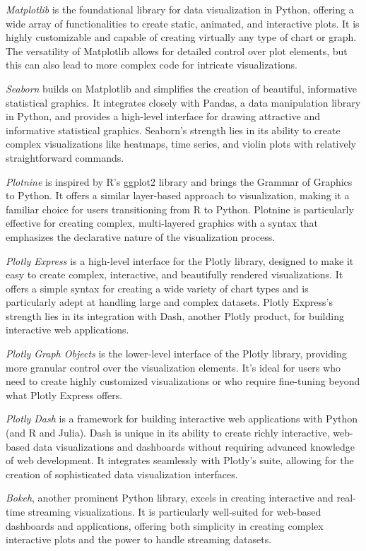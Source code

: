 \emph{Matplotlib} is the foundational library for data visualization in Python, offering a wide array of functionalities to create static, animated, and interactive plots. It is highly customizable and capable of creating virtually any type of chart or graph. The versatility of Matplotlib allows for detailed control over plot elements, but this can also lead to more complex code for intricate visualizations.

\emph{Seaborn} builds on Matplotlib and simplifies the creation of beautiful, informative statistical graphics. It integrates closely with Pandas, a data manipulation library in Python, and provides a high-level interface for drawing attractive and informative statistical graphics. Seaborn's strength lies in its ability to create complex visualizations like heatmaps, time series, and violin plots with relatively straightforward commands.

\emph{Plotnine} is inspired by R's ggplot2 library and brings the Grammar of Graphics to Python. It offers a similar layer-based approach to visualization, making it a familiar choice for users transitioning from R to Python. Plotnine is particularly effective for creating complex, multi-layered graphics with a syntax that emphasizes the declarative nature of the visualization process.

\emph{Plotly Express} is a high-level interface for the Plotly library, designed to make it easy to create complex, interactive, and beautifully rendered visualizations. It offers a simple syntax for creating a wide variety of chart types and is particularly adept at handling large and complex datasets. Plotly Express's strength lies in its integration with Dash, another Plotly product, for building interactive web applications.

\emph{Plotly Graph Objects} is the lower-level interface of the Plotly library, providing more granular control over the visualization elements. It's ideal for users who need to create highly customized visualizations or who require fine-tuning beyond what Plotly Express offers.

\emph{Plotly Dash} is a framework for building interactive web applications with Python (and R and Julia). Dash is unique in its ability to create richly interactive, web-based data visualizations and dashboards without requiring advanced knowledge of web development. It integrates seamlessly with Plotly's suite, allowing for the creation of sophisticated data visualization interfaces.

\emph{Bokeh}, another prominent Python library, excels in creating interactive and real-time streaming visualizations. It is particularly well-suited for web-based dashboards and applications, offering both simplicity in creating complex interactive plots and the power to handle streaming datasets.

